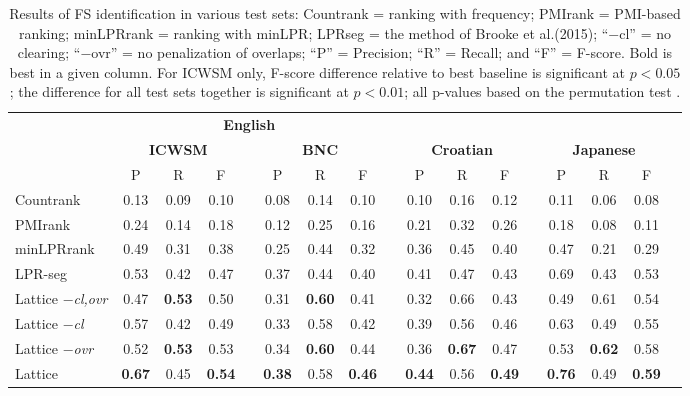 \documentclass[11pt,letterpaper]{article}
\makeatletter
\def \al {al.\@ }
\makeatother
\begin{document}
 \begin{table}[!bt]
 
 \begin{center}
	 \setlength{\tabcolsep}{5.5pt}
\begin{tabular}{lcccccccccccccccc}

       \toprule
				& \multicolumn{7}{c}{\bf{English}} \\
       \cmidrule(lr){2-8}			
       & \multicolumn{3}{c}{\bf{ICWSM}} & &  \multicolumn{3}{c}{\bf{BNC}} & & \multicolumn{3}{c}{\bf{Croatian}}  && \multicolumn{3}{c}{\bf{Japanese}} \\
       \cmidrule(lr){2-4} \cmidrule(lr){6-8} \cmidrule(lr){10-12} \cmidrule(lr){14-16}
      & P & R & F &   & P & R & F &   & P & R & F &  & P & R & F \\
          \midrule 
Countrank & 0.13& 0.09 & 0.10 && 0.08 & 0.14 & 0.10 && 0.10 & 0.16 & 0.12 && 0.11 & 0.06 & 0.08 \\
PMIrank & 0.24& 0.14& 0.18 & & 0.12 & 0.25 & 0.16 & & 0.21 &0.32 & 0.26 & & 0.18& 0.08 & 0.11 \\ 
minLPRrank & 0.49& 0.31 & 0.38 & & 0.25& 0.44 & 0.32 & & 0.36 & 0.45 & 0.40 &  & 0.47 & 0.21 & 0.29 \\ 

LPR-seg  &0.53 & 0.42 & 0.47 && 0.37 & 0.44 & 0.40 & & 0.41 & 0.47  & 0.43 &  & 0.69 & 0.43 & 0.53 \\ 
  \midrule

	Lattice \emph{$-$cl,ovr} & 0.47& \bf{0.53} & 0.50 & & 0.31& \bf{0.60} & 0.41 & & 0.32 & 0.66 & 0.43 & & 0.49 & 0.61 & 0.54 \\ 

	Lattice \emph{$-$cl} & 0.57& 0.42 & 0.49 & & 0.33& 0.58 & 0.42 & & 0.39 & 0.56 & 0.46 & & 0.63 & 0.49 & 0.55 \\  	 
			
	Lattice \emph{$-$ovr} & 0.52& \bf{0.53} & 0.53 & & 0.34& \bf{0.60} & 0.44& & 0.36 & \bf{0.67} & 0.47 & & 0.53 & \bf{0.62} & 0.58 \\  
			
				Lattice & \bf{0.67} & 0.45 & \bf{0.54} & & \bf{0.38}& 0.58 & \bf{0.46} & &\bf{0.44} & 0.56 & \bf{0.49} & & \bf{0.76} & 0.49 & \bf{0.59} \\ 
            \bottomrule

 \end{tabular}
 \caption{Results of FS identification in various test sets: Countrank = ranking with frequency; PMIrank = PMI-based ranking; minLPRrank = ranking with minLPR; LPRseg = the method of Brooke et \al (2015); ``$-$cl'' = no clearing; ``$-$ovr'' = no penalization of overlaps; ``P'' = Precision; ``R'' = Recall; and ``F'' = F-score. Bold is best in a given column. For ICWSM only, F-score difference relative to best baseline is significant at $p < 0.05$; the difference for all test sets together is significant at $ p < 0.01$; all p-values based on the permutation test \protect\cite{yeh2000more}.}
	 \label{tab:main}

 \end{center}


 \end{table}
\end{document}
